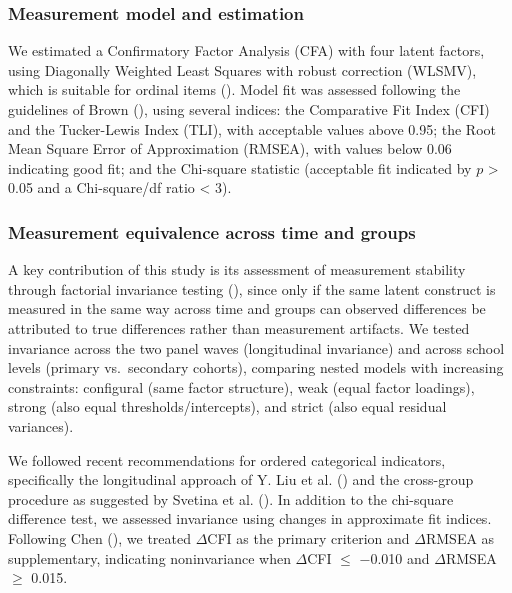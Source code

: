 \documentclass[
  11pt,
]{article}
\begin{document}
\subsubsection{Measurement model and
estimation}\label{measurement-model-and-estimation}

We estimated a Confirmatory Factor Analysis (CFA) with four latent
factors, using Diagonally Weighted Least Squares with robust correction
(WLSMV), which is suitable for ordinal items
(). Model fit was
assessed following the guidelines of Brown
(), using several indices:
the Comparative Fit Index (CFI) and the Tucker-Lewis Index (TLI), with
acceptable values above 0.95; the Root Mean Square Error of
Approximation (RMSEA), with values below 0.06 indicating good fit; and
the Chi-square statistic (acceptable fit indicated by \(p\)
\textgreater{} 0.05 and a Chi-square/df ratio \textless{} 3).

\subsubsection{Measurement equivalence across time and
groups}\label{measurement-equivalence-across-time-and-groups}

A key contribution of this study is its assessment of measurement
stability through factorial invariance testing
(),
since only if the same latent construct is measured in the same way
across time and groups can observed differences be attributed to true
differences rather than measurement artifacts. We tested invariance
across the two panel waves (longitudinal invariance) and across school
levels (primary vs.~secondary cohorts), comparing nested models with
increasing constraints: configural (same factor structure), weak (equal
factor loadings), strong (also equal thresholds/intercepts), and strict
(also equal residual variances).

We followed recent recommendations for ordered categorical indicators,
specifically the longitudinal approach of Y. Liu et al.
() and the cross-group procedure as
suggested by Svetina et al.
(). In addition to the
chi-square difference test, we assessed invariance using changes in
approximate fit indices. Following Chen
(), we treated \(\Delta\)CFI
as the primary criterion and \(\Delta\)RMSEA as supplementary,
indicating noninvariance when \(\Delta\)CFI \(\leq\) −0.010 and
\(\Delta\)RMSEA \(\geq\) 0.015.
\end{document}
